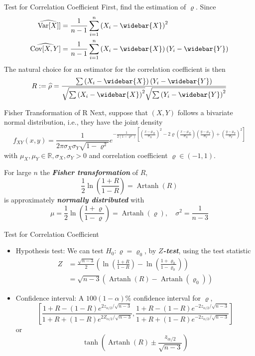 \documentclass{beamer}
\newcommand{\bb}[1]{\textcolor{antiquefuchsia}{\textbf{\textit{#1}}}}
\begin{document}
\begin{frame}{Test for Correlation Coefficient}
First, find the estimation of $\varrho$. Since
$$
\begin{aligned}
\widehat{\operatorname{Var}[X]}] &=\frac{1}{n-1} \sum_{i=1}^{n}\left(X_{i}-\widebar{X}\right)^{2} \\
\widehat{\operatorname{Cov}[X, Y]} &=\frac{1}{n-1} \sum_{i=1}^{n}\left(X_{i}-\widebar{X}\right)\left(Y_{i}-\widebar{Y}\right)
\end{aligned}
$$
The natural choice for an estimator for the correlation coefficient is then
$$
R:=\widehat{\rho}=\frac{\sum\left(X_{i}-\widebar{X}\right)\left(Y_{i}-\widebar{Y}\right)}{\sqrt{\sum\left(X_{i}-\widebar{X}\right)^{2}} \sqrt{\sum\left(Y_{i}-\widebar{Y}\right)^{2}}}
$$


\end{frame}

\begin{frame}{Fisher Transformation of R}
Next, suppose that $(X, Y)$ follows a bivariate normal distribution, i.e., they have the joint density
$$
f_{X Y}(x, y)=\frac{1}{2 \pi \sigma_{X} \sigma_{Y} \sqrt{1-\varrho^{2}}} e^{-\frac{1}{2\left(1-\varrho^{2}\right)}\left[\left(\frac{x-\mu_{X}}{\sigma_{X}}\right)^{2}-2 \varrho\left(\frac{x-\mu_{X}}{\sigma_{X}}\right)\left(\frac{y-\mu_{Y}}{\sigma_{Y}}\right)+\left(\frac{y-\mu_{Y}}{\sigma_{Y}}\right)^{2}\right]}
$$
with $\mu_{X}, \mu_{Y} \in \mathbb{R}, \sigma_{X}, \sigma_{Y}>0$ and correlation coefficient $\varrho \in(-1,1)$.

For large $n$ the \bb{Fisher transformation} of $R$,
$$
\frac{1}{2} \ln \left(\frac{1+R}{1-R}\right)=\operatorname{Artanh}(R)
$$
is approximately \bb{normally distributed} with
$$
\mu=\frac{1}{2} \ln \left(\frac{1+\varrho}{1-\varrho}\right)=\operatorname{Artanh}(\varrho), \quad \sigma^{2}=\frac{1}{n-3}
$$
\end{frame}

\begin{frame}{Test for Correlation Coefficient}
\begin{itemize}
\item Hypothesis test: We can test $H_{0}: \varrho=\varrho_{0}$, by \bb{$Z$-test}, using the test statistic
$$
\begin{aligned}
Z &=\frac{\sqrt{n-3}}{2}\left(\ln \left(\frac{1+R}{1-R}\right)-\ln \left(\frac{1+\varrho_{0}}{1-\varrho_{0}}\right)\right) \\
&=\sqrt{n-3}\left(\operatorname{Artanh}(R)-\operatorname{Artanh}\left(\varrho_{0}\right)\right)
\end{aligned}
$$
\item Confidence interval: A $100(1-\alpha) \%$ confidence interval for $\varrho$,
$$
\left[\frac{1+R-(1-R) e^{2 z_{\alpha / 2} / \sqrt{n-3}}}{1+R+(1-R) e^{2 Z_{\alpha / 2} / \sqrt{n-3}}}, \frac{1+R-(1-R) e^{-2 z_{\alpha / 2} / \sqrt{n-3}}}{1+R+(1-R) e^{-2 z_{\alpha / 2} / \sqrt{n-3}}}\right]
$$
or
$$
\tanh \left(\operatorname{Artanh}(R) \pm \frac{z_{\alpha / 2}}{\sqrt{n-3}}\right)
$$
\end{itemize}

\end{frame}
\end{document}
